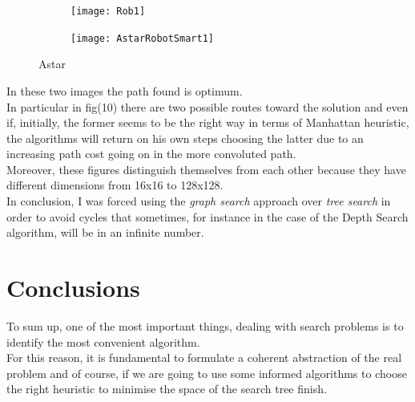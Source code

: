 \documentclass{article}
\begin{document}
\begin{figure}
\centering
\begin{subfigure}{.5\textwidth}
  \centering
  \texttt{[image: Rob1]}
  \caption{}
  \label{fig:9}
\end{subfigure}%
\begin{subfigure}{.5\textwidth}
  \centering
  \texttt{[image: AstarRobotSmart1]}
  \caption{}
  \label{fig:10}
\end{subfigure}
\caption{Astar}
\label{fig:9,10}
\end{figure}
				In these two images the path found is optimum.	\\
				In particular in fig(10) there are two possible routes toward the solution and even if, initially, the former seems to be the right way in terms of Manhattan heuristic, the algorithms will return on his own steps choosing the latter due to an increasing path cost going on in the more convoluted path.\\
				Moreover, these figures distinguish themselves from each other because they have different dimensions from 16x16 to 128x128.\\
				In conclusion, I was forced using the \textit{ graph search}  approach over \textit{tree search} in order to avoid cycles that sometimes, for instance in the case of the Depth Search algorithm, will be in an infinite number.
\newpage		
\medskip
				\section{Conclusions}
				\medskip\medskip
				To sum up, one of the most important things, dealing with search problems is to identify the most convenient algorithm.\\
				For this reason, it is fundamental to formulate a coherent abstraction of the real problem and of course, if we are going to use some informed algorithms to choose the right heuristic to minimise the space of the search tree finish.
		
\end{document}
